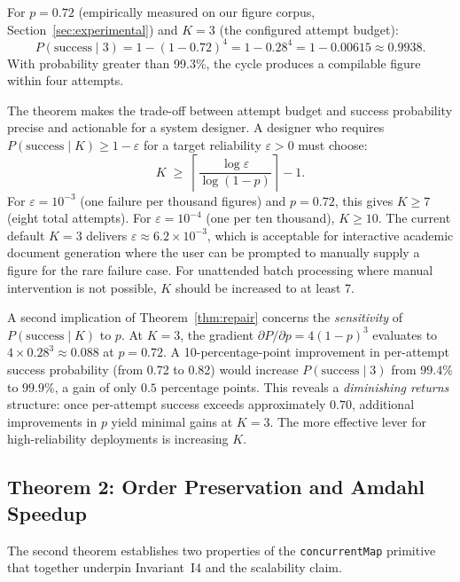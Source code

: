 \begin{corollary}
\label{cor:repair}
For $p=0.72$ (empirically measured on our figure corpus, Section~\ref{sec:experimental})
and $K=3$ (the configured attempt budget):
\[
  P(\mathrm{success}\mid 3) = 1 - (1-0.72)^4 = 1 - 0.28^4 = 1 - 0.00615 \approx 0.9938.
\]
With probability greater than 99.3\%, the \tvg{} cycle produces a compilable figure
within four attempts.
\end{corollary}

The theorem makes the trade-off between attempt budget and success probability precise
and actionable for a system designer.
A designer who requires $P(\mathrm{success}\mid K)\geq 1-\varepsilon$ for a target
reliability $\varepsilon>0$ must choose:
\[
  K \;\geq\; \left\lceil \frac{\log\varepsilon}{\log(1-p)} \right\rceil - 1.
\]
For $\varepsilon=10^{-3}$ (one failure per thousand figures) and $p=0.72$, this gives
$K\geq 7$ (eight total attempts).
For $\varepsilon=10^{-4}$ (one per ten thousand), $K\geq 10$.
The current default $K=3$ delivers $\varepsilon\approx 6.2\times 10^{-3}$, which
is acceptable for interactive academic document generation where the user can be
prompted to manually supply a figure for the rare failure case.
For unattended batch processing where manual intervention is not possible, $K$ should
be increased to at least 7.

A second implication of Theorem~\ref{thm:repair} concerns the \emph{sensitivity} of
$P(\mathrm{success}\mid K)$ to $p$.
At $K=3$, the gradient $\partial P/\partial p = 4(1-p)^3$ evaluates to
$4\times 0.28^3 \approx 0.088$ at $p=0.72$.
A 10-percentage-point improvement in per-attempt success probability (from 0.72 to 0.82)
would increase $P(\mathrm{success}\mid 3)$ from $99.4\%$ to $99.9\%$, a gain of
only $0.5$ percentage points.
This reveals a \emph{diminishing returns} structure: once per-attempt success exceeds
approximately $0.70$, additional improvements in $p$ yield minimal gains at $K=3$.
The more effective lever for high-reliability deployments is increasing $K$.

\subsection{Theorem 2: Order Preservation and Amdahl Speedup}

The second theorem establishes two properties of the \texttt{concurrentMap} primitive
that together underpin Invariant~I4 and the scalability claim.

